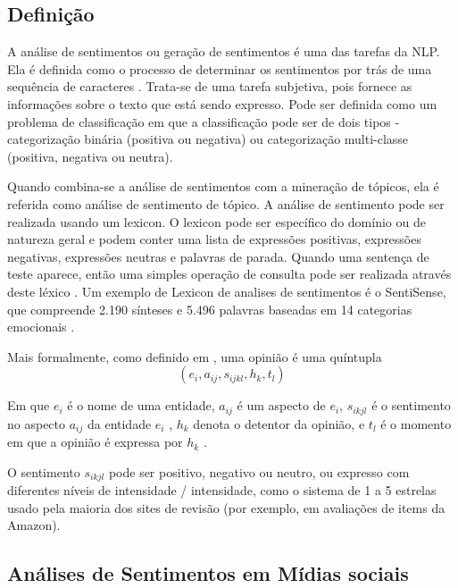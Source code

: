 \documentclass[
	12pt,				%
	openright,			%
	oneside,			%
	a4paper,			%
	english,			%
	spanish,			%
	brazil				%
	]{abntex2}
\begin{document}
	\subsection*{Definição}
	
	A análise de sentimentos ou geração de sentimentos é uma das tarefas da NLP. Ela é definida como o processo de determinar os sentimentos por trás de uma sequência de caracteres \cite{book_natlang_python}. Trata-se de uma tarefa subjetiva, pois fornece as informações sobre o texto que está sendo expresso. Pode ser definida como um problema de classificação em que a classificação pode ser de dois tipos - categorização binária (positiva ou negativa) ou categorização multi-classe (positiva, negativa ou neutra). 
	
Quando combina-se a análise de sentimentos com a mineração de tópicos, ela é referida como análise de sentimento de tópico. A análise de sentimento pode ser realizada usando um lexicon. O lexicon pode ser específico do domínio ou de natureza geral e podem conter uma lista de expressões positivas, expressões negativas, expressões neutras e palavras de parada. Quando uma sentença de teste aparece, então uma simples operação de consulta pode ser realizada através deste léxico \cite{book_natlang_python}. Um exemplo de Lexicon de analises de sentimentos é o SentiSense, que compreende 2.190 sínteses e 5.496 palavras baseadas em 14 categorias emocionais \cite{carrilho}.

Mais formalmente, como definido em \cite{bliu_2012}, uma opinião é uma quíntupla \[ \left ( e_{i}, a_{ij}, s_{ijkl},h_{k},t_{l} \right ) \]


Em que $e_{i}$ é o nome de uma entidade, $a_{ij}$ é um aspecto de $e_{i}$, $s_{ikjl}$ é o sentimento no aspecto $a_{ij}$  da entidade $e_{i}$ , $h_{k}$ denota o detentor da opinião, e $t_{l}$  é o momento em que a opinião é expressa por $h_{k}$ .

O sentimento $s_{ikjl}$ pode ser positivo, negativo ou neutro, ou expresso com diferentes níveis de intensidade / intensidade, como o sistema de 1 a 5 estrelas usado pela maioria dos sites de revisão (por exemplo, em avaliações de items da Amazon).

	\subsection*{Análises de Sentimentos em Mídias sociais}
	
\end{document}
